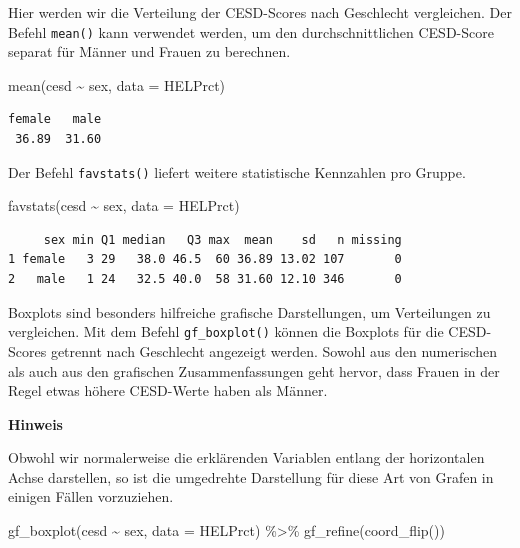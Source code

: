 \documentclass[
  ngerman,
]{scrbook}
\newenvironment{Shaded}{\begin{snugshade}}{\end{snugshade}}
\newcommand{\AttributeTok}[1]{\textcolor[rgb]{0.77,0.63,0.00}{#1}}
\newcommand{\FunctionTok}[1]{\textcolor[rgb]{0.00,0.00,0.00}{#1}}
\newcommand{\NormalTok}[1]{#1}
\newcommand{\SpecialCharTok}[1]{\textcolor[rgb]{0.00,0.00,0.00}{#1}}
\newenvironment{hinweis}[1]
  {
  \begin{itemize}
  \renewcommand{\labelitemi}{
    \raisebox{1.8\height}[0pt][0pt]{
      {\setkeys{Gin}{width=7em,keepaspectratio}
        {\Large \textcolor{dark-fom-green}\faHandORight}}
        }
  }
  \begin{blackbox}
        \bgroup\color{dark-fom-green}
          {\textbf{Hinweis}}
        \egroup
  \item
  }
  {
  \end{blackbox}
  \end{itemize}
  }
\begin{document}
Hier werden wir die Verteilung der CESD-Scores nach Geschlecht vergleichen.
Der Befehl \texttt{mean()} kann verwendet werden, um den durchschnittlichen CESD-Score separat für Männer und Frauen zu berechnen.

\begin{Shaded}
\begin{Highlighting}[]
\FunctionTok{mean}\NormalTok{(cesd }\SpecialCharTok{\textasciitilde{}}\NormalTok{ sex, }\AttributeTok{data =}\NormalTok{ HELPrct)}
\end{Highlighting}
\end{Shaded}

\begin{verbatim}
female   male 
 36.89  31.60 
\end{verbatim}

Der Befehl \texttt{favstats()} liefert weitere statistische Kennzahlen pro Gruppe.

\begin{Shaded}
\begin{Highlighting}[]
\FunctionTok{favstats}\NormalTok{(cesd }\SpecialCharTok{\textasciitilde{}}\NormalTok{ sex, }\AttributeTok{data =}\NormalTok{ HELPrct)}
\end{Highlighting}
\end{Shaded}

\begin{verbatim}
     sex min Q1 median   Q3 max  mean    sd   n missing
1 female   3 29   38.0 46.5  60 36.89 13.02 107       0
2   male   1 24   32.5 40.0  58 31.60 12.10 346       0
\end{verbatim}

Boxplots sind besonders hilfreiche grafische Darstellungen, um Verteilungen zu vergleichen.
Mit dem Befehl \texttt{gf\_boxplot()} können die Boxplots für die CESD-Scores getrennt nach Geschlecht angezeigt werden. Sowohl aus den numerischen als auch aus den grafischen Zusammenfassungen geht hervor, dass Frauen in der Regel etwas höhere CESD-Werte haben als Männer.

\begin{hinweis}{hinweis}
Obwohl wir normalerweise die erklärenden Variablen entlang der horizontalen Achse darstellen, so ist die umgedrehte Darstellung für diese Art von Grafen in einigen Fällen vorzuziehen.

\end{hinweis}

\begin{Shaded}
\begin{Highlighting}[]
\FunctionTok{gf\_boxplot}\NormalTok{(cesd }\SpecialCharTok{\textasciitilde{}}\NormalTok{ sex, }\AttributeTok{data =}\NormalTok{ HELPrct) }\SpecialCharTok{\%\textgreater{}\%} 
  \FunctionTok{gf\_refine}\NormalTok{(}\FunctionTok{coord\_flip}\NormalTok{())}
\end{Highlighting}
\end{Shaded}
\end{document}
